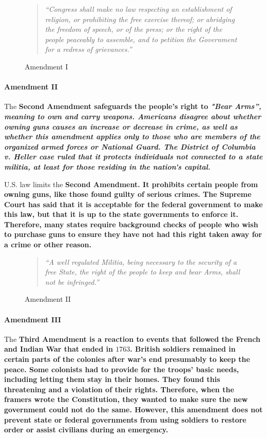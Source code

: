 \begin{figure}[h]
    \begin{quote}
        \it{“Congress shall make no law respecting an establishment of religion, or prohibiting the free exercise thereof; or abridging the freedom of speech, or of the press; or the right of the people peaceably to assemble, and to petition the Government for a redress of grievances.”}
    \end{quote}
    \caption{Amendment I}
\end{figure}

\paragraph{Amendment II}

The \bf{Second Amendment} safeguards the people's right to \it{"Bear Arms”}, meaning to own and carry weapons. Americans disagree about whether owning guns causes an increase or decrease in crime, as well as whether this amendment applies only to those who are members of the organized armed forces or National Guard. The \bf{District of Columbia v. Heller} case ruled that it protects individuals not connected to a state militia, at least for those residing in the nation’s capital.

U.S. law limits the \bf{Second Amendment}. It prohibits certain people from owning guns, like those found guilty of serious crimes. The \bf{Supreme Court} has said that it is acceptable for the federal government to make this law, but that it is up to the state governments to enforce it. Therefore, many states require background checks of people who wish to purchase guns to ensure they have not had this right taken away for a crime or other reason.

\begin{figure}[h]
    \begin{quote}
        \it{“A well regulated Militia, being necessary to the security of a free State, the right of the people to keep and bear Arms, shall not be infringed.”}
    \end{quote}
    \caption{Amendment II}
\end{figure}

\paragraph{Amendment III}

The \bf{Third Amendment} is a reaction to events that followed the \bf{French} and \bf{Indian War} that ended in $1763$. British soldiers remained in certain parts of the colonies after war’s end presumably to keep the peace. Some colonists had to provide for the troops’ basic needs, including letting them stay in their homes. They found this threatening and a violation of their rights. Therefore, when the framers wrote the Constitution, they wanted to make sure the new government could not do the same. However, this amendment does not prevent state or federal governments from using soldiers to restore order or assist civilians during an emergency.

